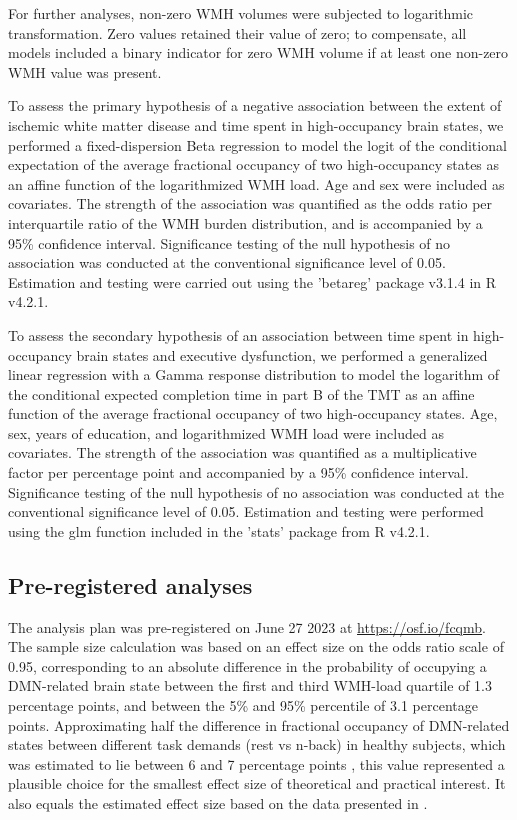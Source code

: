 For further analyses, non-zero WMH volumes were subjected to logarithmic transformation.
Zero values retained their value of zero; to compensate, all models included a binary indicator for zero WMH volume if at least one non-zero WMH value was present.

To assess the primary hypothesis of a negative association between the extent of ischemic white matter disease and time spent in high-occupancy brain states, we performed a fixed-dispersion Beta regression to model the logit of the conditional expectation of the average fractional occupancy of two high-occupancy states as an affine function of the logarithmized WMH load.
Age and sex were included as covariates.
The strength of the association was quantified as the odds ratio per interquartile ratio of the WMH burden distribution, and is accompanied by a 95\% confidence interval.
Significance testing of the null hypothesis of no association was conducted at the conventional significance level of 0.05.
Estimation and testing were carried out using the 'betareg' package v3.1.4 in R v4.2.1.

To  assess the secondary hypothesis of an association between time spent in high-occupancy brain states and executive dysfunction, we performed a generalized linear regression with a Gamma response distribution to model the logarithm of the conditional expected completion time in part B of the TMT as an affine function of the average fractional occupancy of two high-occupancy states.
Age, sex, years of education, and logarithmized WMH load were included as covariates.
The strength of the association was quantified as a multiplicative factor per percentage point and accompanied by a 95\% confidence interval.
Significance testing of the null hypothesis of no association was conducted at the conventional significance level of 0.05.
Estimation and testing were performed using the glm function included in the 'stats' package from R v4.2.1.

\subsection{Pre-registered analyses}
The analysis plan was pre-registered on June 27 2023 at \url{https://osf.io/fcqmb}. The sample size calculation was based on an effect size on the odds ratio scale of 0.95, corresponding to an absolute difference in the probability of occupying a DMN-related brain state between the first and third WMH-load quartile of 1.3 percentage points, and between the 5\% and 95\% percentile of 3.1 percentage points. Approximating half the difference in fractional occupancy of DMN-related states between different task demands (rest vs n-back) in healthy subjects, which was estimated to lie between 6 and 7 percentage points \citep{Cornblath2020-fu}, this value represented a plausible choice for the smallest effect size of theoretical and practical interest. It also equals the estimated effect size based on the data presented in \citep{Schlemm2022-he}.

